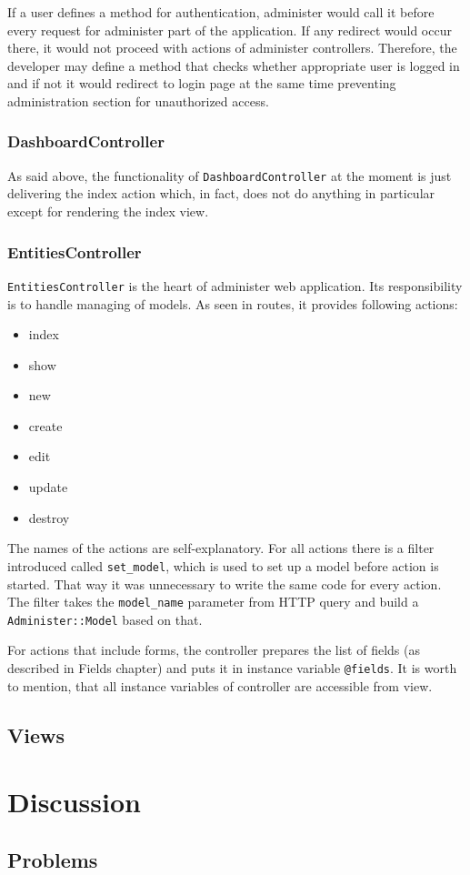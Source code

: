         If a user defines a method for authentication, administer would call it before every request
        for administer part of the application. If any redirect would occur there, it would not proceed
        with actions of administer controllers. Therefore, the developer may define a method that checks 
        whether appropriate user is logged in and if not it would redirect to login page at the same time
        preventing administration section for unauthorized access.
      
      \subsubsection{DashboardController}
       As said above, the functionality of \texttt{DashboardController} at the moment is just delivering
       the index action which, in fact, does not do anything in particular except for rendering the index
       view.
      
      \subsubsection{EntitiesController}
        \texttt{EntitiesController} is the heart of administer web application. Its responsibility 
        is to handle managing of models. As seen in routes, it provides following actions:
        
        \begin{itemize}
          \item index
          \item show
          \item new
          \item create
          \item edit
          \item update
          \item destroy
        \end{itemize}
        
        The names of the actions are self-explanatory. For all actions there is a filter introduced
        called \texttt{set\_model}, which is used to set up a model before action is started.
        That way it was unnecessary to write the same code for every action.
        The filter takes the \texttt{model\_name} parameter from HTTP query and build a 
        \texttt{Administer::Model} based on that.
        
        For actions that include forms, the controller prepares the list of fields (as described in Fields chapter)
        and puts it in instance variable \texttt{@fields}. It is worth to mention, that all instance variables
        of controller are accessible from view.

    \subsection{Views}
  
  \section{Discussion}
    \subsection{Problems}
    
      
      